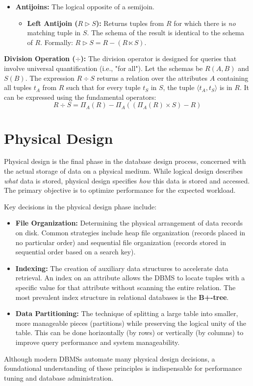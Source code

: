 \begin{itemize}
    \item \textbf{Antijoins:} The logical opposite of a semijoin.
    \begin{itemize}
        \item \textbf{Left Antijoin ($R \triangleright S$):} Returns tuples from $R$ for which there is \textit{no} matching tuple in $S$. The schema of the result is identical to the schema of $R$. Formally: $R \triangleright S = R - (R \ltimes S)$.
    \end{itemize}
\end{itemize}

\noindent\textbf{Division Operation ($\div$):}
The division operator is designed for queries that involve universal quantification (i.e., "for all"). Let the schemas be $R(A,B)$ and $S(B)$. The expression $R \div S$ returns a relation over the attributes $A$ containing all tuples $t_A$ from $R$ such that for every tuple $t_S$ in $S$, the tuple $\langle t_A, t_S \rangle$ is in $R$. It can be expressed using the fundamental operators:
\[ R \div S = \Pi_{A}(R) - \Pi_{A}((\Pi_{A}(R) \times S) - R) \]

\section{Physical Design}
Physical design is the final phase in the database design process, concerned with the actual storage of data on a physical medium. While logical design describes \textit{what} data is stored, physical design specifies \textit{how} this data is stored and accessed. The primary objective is to optimize performance for the expected workload.

Key decisions in the physical design phase include:
\begin{itemize}
    \item \textbf{File Organization:} Determining the physical arrangement of data records on disk. Common strategies include heap file organization (records placed in no particular order) and sequential file organization (records stored in sequential order based on a search key).
    \item \textbf{Indexing:} The creation of auxiliary data structures to accelerate data retrieval. An index on an attribute allows the DBMS to locate tuples with a specific value for that attribute without scanning the entire relation. The most prevalent index structure in relational databases is the \textbf{B+-tree}.
    \item \textbf{Data Partitioning:} The technique of splitting a large table into smaller, more manageable pieces (partitions) while preserving the logical unity of the table. This can be done horizontally (by rows) or vertically (by columns) to improve query performance and system manageability.
\end{itemize}
Although modern DBMSs automate many physical design decisions, a foundational understanding of these principles is indispensable for performance tuning and database administration.


